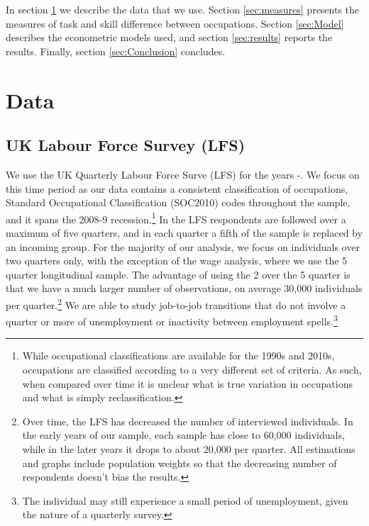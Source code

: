 \documentclass[11pt, oneside]{article}
\begin{document}
	
	\vspace{2mm}
	
	
 In section \ref{sec:Data} we describe the data that we use. Section \ref{sec:measures} presents the measures of task and skill difference between occupations. Section \ref{sec:Model} describes the econometric models used, and section \ref{sec:results} reports the results. Finally, section \ref{sec:Conclusion} concludes.
	


	
	\section{Data}
	\label{sec:Data}
	
	\subsection{UK Labour Force Survey (LFS)}
	
	We use the UK Quarterly Labour Force Surve (LFS) for the years \hspace{-1mm}-\hspace{-1mm}. We focus on this time period as our data contains a consistent classification of occupations, Standard Occupational Classification (SOC2010) codes throughout the sample, and it spans the 2008-9 recession.\footnote{While occupational classifications are available for the 1990s and 2010s, occupations are classified according to a very different set of criteria. As such, when compared over time it is unclear what is true variation in occupations and what is simply reclassification.}  In the LFS respondents are followed over a maximum of five quarters, and in each quarter a fifth of the sample is replaced by an incoming group. For the majority of our analysis, we focus on individuals over two quarters only, with the exception of the wage analysis, where we use the 5 quarter longitudinal sample. The advantage of using the 2 over the 5 quarter is that we have a much larger number of observations, on average 30,000 individuals per quarter.\footnote{Over time, the LFS has decreased the number of interviewed individuals. In the early years of our sample, each sample has close to 60,000 individuals, while in the later years it drops to about 20,000 per quarter. All estimations and graphs include population weights so that the decreasing number of respondents doesn't bias the results.} We are able to study job-to-job transitions that do not involve a quarter or more of unemployment or inactivity between employment spells.\footnote{The individual may still experience a small period of unemployment, given the nature of a quarterly survey.} 
	
\end{document}
